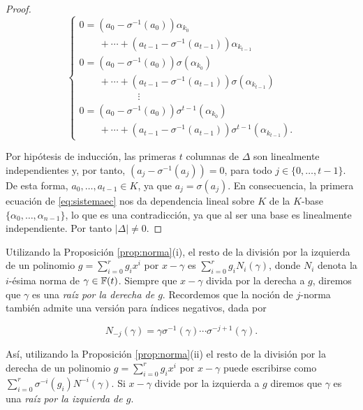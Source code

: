 \begin{proof}
\begin{equation}\label{eq:sistema2}
    \begin{cases}
    0 = \left(a_0 - \sigma^{-1}(a_0)\right)\alpha_{k_0} \\
    \qquad + \cdots + \left(a_{t-1} - \sigma^{-1}(a_{t-1})\right)\alpha_{k_{t-1}} \\
    0 = \left(a_0 - \sigma^{-1}(a_0)\right)\sigma(\alpha_{k_0}) \\
    \qquad + \cdots + \left(a_{t-1} - \sigma^{-1}(a_{t-1})\right)\sigma(\alpha_{k_{t-1}}) \\
    \qquad \qquad \qquad \vdots \\    0 = \left(a_0 - \sigma^{-1}(a_0)\right)\sigma^{t-1}(\alpha_{k_0}) \\
    \qquad + \cdots + \left(a_{t-1} - \sigma^{-1}(a_{t-1})\right)\sigma^{t-1}(\alpha_{k_{t-1}}).
    \end{cases}
    \end{equation}

Por hipótesis de inducción, las primeras $t$ columnas de $\Delta$ son linealmente independientes y, por tanto, $(a_j - \sigma^{-1}(a_j)) = 0$, para todo $j \in \{0,\dots,t-1\}.$ De esta forma, $a_0,\dots,a_{t-1} \in K$, ya que $a_j = \sigma(a_j)$. En consecuencia, la primera ecuación de \ref{eq:sistemaec} nos da dependencia lineal sobre $K$ de la $K$-base $\{\alpha_0,\dots,\alpha_{n-1}\}$, lo que es una contradicción, ya que al ser una base es linealmente independiente. Por tanto $|\Delta| \neq 0$.
\end{proof}

Utilizando la Proposición \ref{prop:norma}(i), el resto de la división por la izquierda de un polinomio $g = \sum_{i=0}^{r}g_ix^i$ por $x - \gamma$ es $\sum_{i=0}^{r}g_iN_i(\gamma)$, donde $N_i$ denota la $i$-ésima norma de $\gamma \in \mathbb{F}(t)$. Siempre que $x - \gamma$ divida por la derecha a $g$, diremos que $\gamma$ es una \emph{raíz por la derecha de $g$}. Recordemos que la noción de $j$-norma también admite una versión para índices negativos, dada por 

$$N_{-j}(\gamma) = \gamma\sigma^{-1}(\gamma)\cdots\sigma^{-j+1}(\gamma).$$

Así, utilizando la Proposición \ref{prop:norma}(ii) el resto de la división por la derecha de un polinomio $g = \sum_{i=0}^{r}g_ix^i$ por $x - \gamma$ puede escribirse como $\sum_{i=0}^{r}\sigma^{-i}(g_i)N^{-i}(\gamma)$. Si $x - \gamma$ divide por la izquierda a $g$ diremos que $\gamma$ es una \emph{raíz por la izquierda de $g$}.


